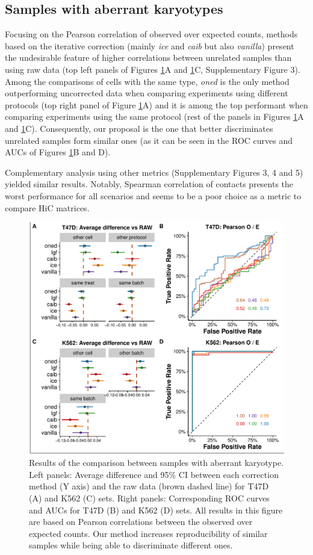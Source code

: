 \documentclass{bioinfo}
\begin{document}
\subsection{Samples with aberrant karyotypes}

Focusing on the Pearson correlation of observed over expected counts, methods based on the iterative correction (mainly \textit{ice} and \textit{caib} but also \textit{vanilla}) present the undesirable feature of higher correlations between unrelated samples than using raw data (top left panels of Figures \ref{fig:aberrant}A and \ref{fig:aberrant}C, Supplementary Figure 3). Among the comparisons of cells with the same type, \textit{oned} is the only method outperforming uncorrected data when comparing experiments using different protocols (top right panel of Figure \ref{fig:aberrant}A) and it is among the top performant when comparing experiments using the same protocol (rest of the panels in Figures \ref{fig:aberrant}A and \ref{fig:aberrant}C). Consequently, our proposal is the one that better discriminates unrelated samples form similar ones (as it can be seen in the ROC curves and AUCs of Figures \ref{fig:aberrant}B and D).

Complementary analysis using other metrics (Supplementary Figures 3, 4 and 5) yielded similar results. Notably, Spearman correlation of contacts presents the worst performance for all scenarios and seems to be a poor choice as a metric to compare HiC matrices.


\begin{figure}
	\centerline{\includegraphics[width=.50\textwidth]{img/correlation_aberrant_figure3.pdf}}
	\caption{
		Results of the comparison between samples with aberrant karyotype. Left panels: Average difference and 95\% CI between each correction method (Y axis) and the raw data (brown dashed line) for T47D (A) and K562 (C) sets. Right panels: Corresponding ROC curves and AUCs for T47D (B) and K562 (D) sets. All results in this figure are based on Pearson correlations between the observed over expected counts. Our method increases reproducibility of similar samples while being able to discriminate different ones.
	}\label{fig:aberrant}
\end{figure}
\end{document}
